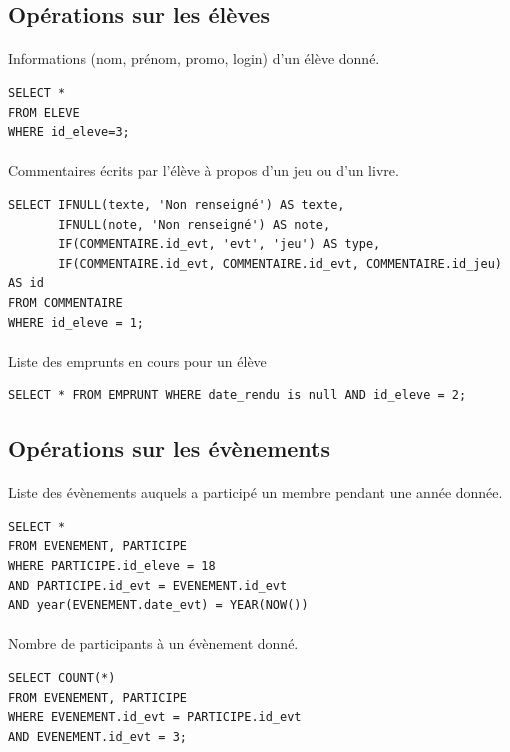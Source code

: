 \documentclass[a4paper, 11pt]{article}
\begin{document}
\subsection{Opérations sur les élèves}
\paragraph{}
Informations (nom, prénom, promo, login) d'un élève donné.
\begin{verbatim}
SELECT *
FROM ELEVE 
WHERE id_eleve=3;
\end{verbatim}
\paragraph{}
Commentaires écrits par l'élève à propos d'un jeu ou d'un livre.
\begin{verbatim}
SELECT IFNULL(texte, 'Non renseigné') AS texte,
       IFNULL(note, 'Non renseigné') AS note,
       IF(COMMENTAIRE.id_evt, 'evt', 'jeu') AS type, 
       IF(COMMENTAIRE.id_evt, COMMENTAIRE.id_evt, COMMENTAIRE.id_jeu) AS id
FROM COMMENTAIRE
WHERE id_eleve = 1;
\end{verbatim}
\paragraph{}
Liste des emprunts en cours pour un élève
\begin{verbatim}
SELECT * FROM EMPRUNT WHERE date_rendu is null AND id_eleve = 2;
\end{verbatim}
\subsection{Opérations sur les évènements}
\paragraph{}
Liste des évènements auquels a participé un membre pendant une année donnée.
\begin{verbatim}
SELECT *
FROM EVENEMENT, PARTICIPE
WHERE PARTICIPE.id_eleve = 18
AND PARTICIPE.id_evt = EVENEMENT.id_evt
AND year(EVENEMENT.date_evt) = YEAR(NOW())
\end{verbatim}
\paragraph{}
Nombre de participants à un évènement donné.
\begin{verbatim}
SELECT COUNT(*)
FROM EVENEMENT, PARTICIPE
WHERE EVENEMENT.id_evt = PARTICIPE.id_evt
AND EVENEMENT.id_evt = 3;
\end{verbatim}
\end{document}
